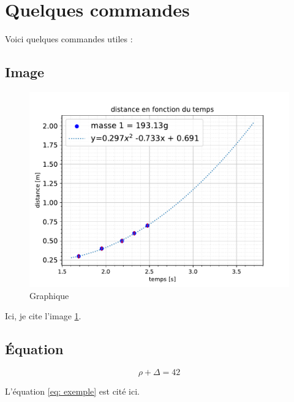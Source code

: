 
\section{Quelques commandes}

Voici quelques commandes utiles :

\subsection{Image}

\begin{figure}[H] %
    \center
    \includegraphics[width=16cm]{./logos/graph.pdf}
    \caption{Graphique}
    \label{Label de la figure}
\end{figure}

Ici, je cite l'image \ref{Label de la figure}.

\subsection{Équation}


\begin{equation} \label{eq: exemple}
\rho + \Delta = 42
\end{equation}

L'équation \ref{eq: exemple} est cité ici. 

